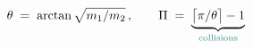 \documentclass[preview,border=2pt]{standalone}
\begin{document}
$\theta \;=\; \arctan\sqrt{m_1/m_2}\,,\qquad \Pi \;=\; \underbrace{\bigl\lceil \pi/\theta \bigr\rceil - 1}_{\textcolor{acc}{\text{collisions}}}$
\end{document}

